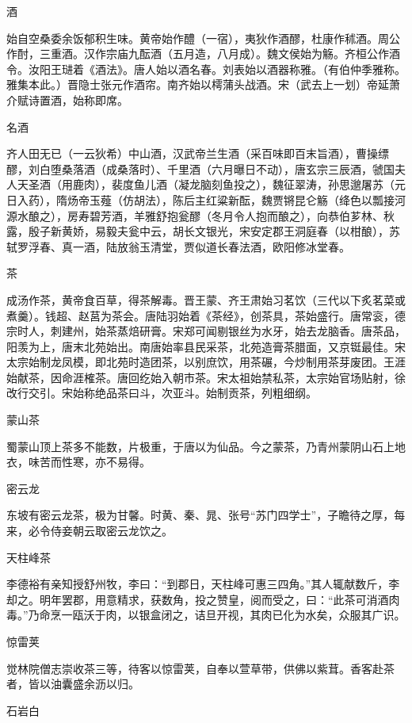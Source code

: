 \documentclass[a4paper,12pt,UTF8,twoside]{ctexbook}
\begin{document}
    酒
    
    始自空桑委余饭郁积生味。黄帝始作醴（一宿），夷狄作酒醪，杜康作秫酒。周公作酎，三重酒。汉作宗庙九酝酒（五月造，八月成）。魏文侯始为觞。齐桓公作酒令。汝阳王琎着《酒法》。唐人始以酒名春。刘表始以酒器称雅。（有伯仲季雅称。雅集本此。）晋隐士张元作酒帘。南齐始以樗蒲头战酒。宋（武去上一划）帝延萧介赋诗置酒，始称即席。
    
    名酒
    
    齐人田无已（一云狄希）中山酒，汉武帝兰生酒（采百味即百末旨酒），曹操缥醪，刘白堕桑落酒（成桑落时）、千里酒（六月曝日不动），唐玄宗三辰酒，虢国夫人天圣酒（用鹿肉），裴度鱼儿酒（凝龙脑刻鱼投之），魏征翠涛，孙思邈屠苏（元日入药），隋炀帝玉薤（仿胡法），陈后主红粱新酝，魏贾锵昆仑觞（绛色以瓢接河源水酿之），房寿碧芳酒，羊雅舒抱瓮醪（冬月令人抱而酿之），向恭伯芗林、秋露，殷子新黄娇，易毅夫瓮中云，胡长文银光，宋安定郡王洞庭春（以柑酿），苏轼罗浮春、真一酒，陆放翁玉清堂，贾似道长春法酒，欧阳修冰堂春。
    
    茶
    
    成汤作茶，黄帝食百草，得茶解毒。晋王蒙、齐王肃始习茗饮（三代以下炙茗菜或煮羹）。钱超、赵莒为茶会。唐陆羽始着《茶经》，创茶具，茶始盛行。唐常衮，德宗时人，刺建州，始茶蒸焙研膏。宋郑可闻剔银丝为水牙，始去龙脑香。唐茶品，阳羡为上，唐末北苑始出。南唐始率县民采茶，北苑造膏茶腊面，又京铤最佳。宋太宗始制龙凤模，即北苑时造团茶，以别庶饮，用茶碾，今炒制用茶芽废团。王涯始献茶，因命涯榷茶。唐回纥始入朝市茶。宋太祖始禁私茶，太宗始官场贴射，徐改行交引。宋始称绝品茶曰斗，次亚斗。始制贡茶，列粗细纲。
    
    蒙山茶
    
    蜀蒙山顶上茶多不能数，片极重，于唐以为仙品。今之蒙茶，乃青州蒙阴山石上地衣，味苦而性寒，亦不易得。
    
    密云龙
    
    东坡有密云龙茶，极为甘馨。时黄、秦、晁、张号“苏门四学士”，子瞻待之厚，每来，必令侍妾朝云取密云龙饮之。
    
    天柱峰茶
    
    李德裕有亲知授舒州牧，李曰：“到郡日，天柱峰可惠三四角。”其人辄献数斤，李却之。明年罢郡，用意精求，获数角，投之赞皇，阅而受之，曰：“此茶可消酒肉毒。”乃命烹一瓯沃于肉，以银盒闭之，诘旦开视，其肉已化为水矣，众服其广识。
    
    惊雷荚
    
    觉林院僧志崇收茶三等，待客以惊雷荚，自奉以萱草带，供佛以紫茸。香客赴茶者，皆以油囊盛余沥以归。
    
    石岩白
    
\end{document}
